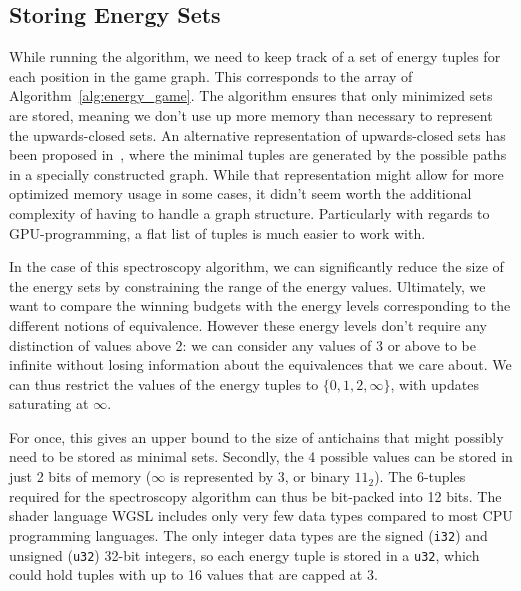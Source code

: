 \subsection{Storing Energy Sets}\label{subsec:energy_memory}

While running the algorithm, we need to keep track of a set of energy tuples
for each position in the game graph.
This corresponds to the \Energies array of Algorithm~\ref{alg:energy_game}.
The algorithm ensures that only minimized sets are stored,
meaning we don't use up more memory than necessary to represent the
upwards-closed sets.
An alternative representation of upwards-closed sets has been proposed
in~\cite{Delzanno2000}, where the minimal tuples are generated by the possible
paths in a specially constructed graph.
While that representation might allow for more optimized memory usage in some cases,
it didn't seem worth the additional complexity of having to handle a graph structure.
Particularly with regards to GPU-programming, a flat list of tuples is much
easier to work with.

In the case of this spectroscopy algorithm, we can significantly reduce the
size of the energy sets by constraining the range of the energy values.
Ultimately, we want to compare the winning budgets with the energy levels
corresponding to the different notions of equivalence.
However these energy levels don't require any distinction of values above 2:
we can consider any values of 3 or above to be infinite without losing
information about the equivalences that we care about.
We can thus restrict the values of the energy tuples to $\{0, 1, 2, \infty\}$,
with updates saturating at $\infty$.

For once, this gives an upper bound to the size of antichains that might
possibly need to be stored as minimal sets.
Secondly, the 4 possible values can be stored in just 2 bits of memory
($\infty$ is represented by 3, or binary $11_2$).
The 6-tuples required for the spectroscopy algorithm can thus be bit-packed
into 12 bits.
The shader language WGSL includes only very few data types compared to most CPU
programming languages.
The only integer data types are the signed (\texttt{i32}) and unsigned
(\texttt{u32}) 32-bit integers,
so each energy tuple is stored in a \texttt{u32},
which could hold tuples with up to 16 values that are capped at 3.


